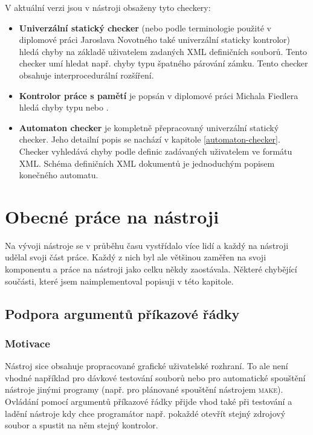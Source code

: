 \documentclass[11pt,final,oneside]{fithesis}
\begin{document}
V aktuální verzi jsou v nástroji obsaženy tyto checkery:
\begin{itemize}
	\item \textbf{Univerzální statický checker} (nebo podle terminologie použité v diplomové práci Jaroslava Novotného\cite{jarek} také univerzální staticky kontrolor) hledá chyby na základě uživatelem zadaných XML definičních souborů. Tento checker umí hledat např. chyby typu špatného párování zámku. Tento checker obsahuje interprocedurální rozšíření.
	\item \textbf{Kontrolor práce s pamětí} je popsán v diplomové práci Michala Fiedlera\cite{michal} hledá chyby typu  nebo .
	\item \textbf{Automaton checker} je kompletně přepracovaný univerzální statický checker. Jeho detailní popis se nachází v kapitole \ref{automaton-checker}. Checker vyhledává chyby podle definic zadávaných uživatelem ve formátu XML. Schéma definičních XML dokumentů je jednoduchým popisem konečného automatu.
\end{itemize}



\chapter{Obecné práce na nástroji}

Na vývoji nástroje se v průběhu času vystřídalo více lidí a každý na nástroji udělal svoji část práce. Každý z nich byl ale většinou zaměřen na svoji komponentu a práce na nástroji jako celku někdy zaostávala. Některé chybějící součásti, které jsem naimplementoval popisuji v této kapitole.

\section{Podpora argumentů příkazové řádky}\label{toc-command-line}
\subsection{Motivace}
Nástroj sice obsahuje propracované grafické uživatelské rozhraní. To ale není vhodné například pro dávkové testování souborů nebo pro automatické spouštění nástroje jinými programy (např. pro plánované spouštění nástrojem \textsc{make}). Ovládání pomocí argumentů příkazové řádky přijde vhod také při testování a ladění nástroje kdy chce programátor např. pokaždé otevřít stejný zdrojový soubor a spustit na něm stejný kontrolor.
\end{document}
